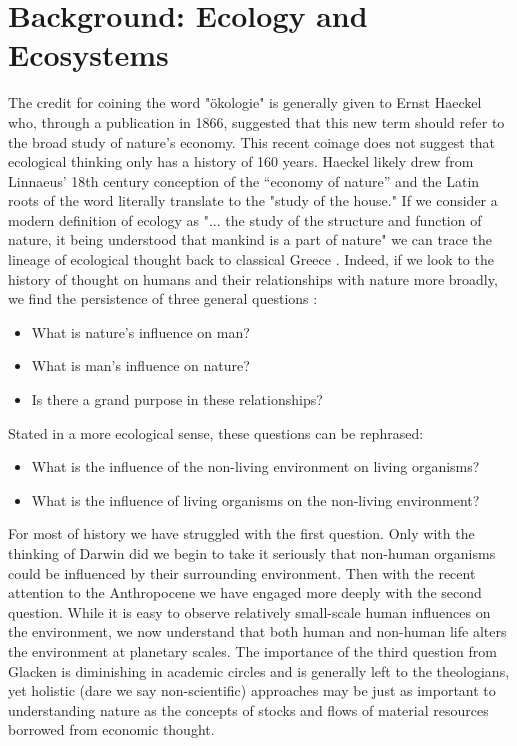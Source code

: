\section {Background: Ecology and Ecosystems}

The credit for coining the word "ökologie" is generally given to Ernst Haeckel who, through a publication in 1866, suggested that this new term should refer to the broad study of nature's economy. This recent coinage does not suggest that ecological thinking only has a history of 160 years. Haeckel likely drew from Linnaeus’ 18th century conception of the “economy of nature” \citep{worster_1977} and the Latin roots of the word literally translate to the "study of the house." If we consider a modern definition of ecology as "... the study of the structure and function of nature, it being understood that mankind is a part of nature" we can trace the lineage of ecological thought back to classical Greece \citep[][p. 3]{odum_1953}. Indeed, if we look to the history of thought on humans and their relationships with nature more broadly, we find the persistence of three general questions \citep{glacken_1967}: \begin{itemize} \item What is nature's influence on man? \item What is man's influence on nature? \item Is there a grand purpose in these relationships? \end{itemize} Stated in a more ecological sense, these questions can be rephrased: \begin{itemize} \item What is the influence of the non-living environment on living organisms? \item What is the influence of living organisms on the non-living environment? \end{itemize} For most of history we have struggled with the first question. Only with the thinking of Darwin did we begin to take it seriously that non-human organisms could be influenced by their surrounding environment. Then with the recent attention to the Anthropocene we have engaged more deeply with the second question. While it is easy to observe relatively small-scale human influences on the environment, we now understand that both human and non-human life alters the environment at planetary scales. The importance of the third question from Glacken is diminishing in academic circles and is generally left to the theologians, yet holistic (dare we say non-scientific) approaches may be just as important to understanding nature as the concepts of stocks and flows of material resources borrowed from economic thought. 

